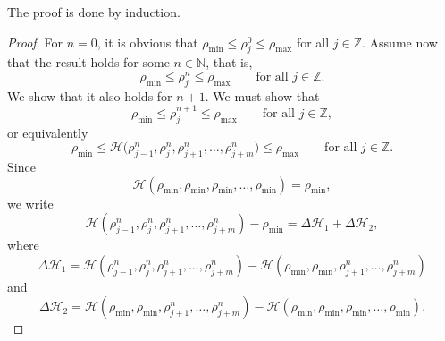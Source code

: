 The proof is done by induction.
\begin{proof}
    For $n=0$, it is obvious that $\rho_{\min} \leq \rho_j^0 \leq \rho_{\max}$ for all $ j \in \mathbb{Z}$. Assume now that the result holds for some $n \in \mathbb{N}$, that is,
    \[
        \rho_{\min} \leq \rho_j^n \leq \rho_{\max}  \qquad \text{for all } j \in \mathbb{Z}.
    \] We show that it also holds for $n+1$. We must show that
    \[
        \rho_{\min} \leq \rho_j^{n+1} \leq \rho_{\max} \qquad \text{for all } j \in \mathbb{Z},
    \]
    or equivalently
    \[
        \rho_{\min} \leq \mathcal{H}\bigl(\rho_{j-1}^n,\rho_j^n, \rho_{j+1}^n, \dots,\rho_{j+m}^n \bigr) \leq
        \rho_{\max} \qquad \text{for all } j \in \mathbb{Z}.
    \]
    Since
    \[
        \mathcal{H}(\rho_{\min},\rho_{\min},\rho_{\min},\dots,\rho_{\min})
        =\rho_{\min},
    \]
    we write
    \[
        \mathcal{H}(\rho_{j-1}^n,\rho_j^n,\rho_{j+1}^n,\dots,\rho_{j+m}^n)-\rho_{\min}
        =
        \Delta \mathcal{H}_1+\Delta \mathcal{H}_2,
    \]
    where
    \[\Delta \mathcal{H}_1 = \mathcal{H}( \rho_{j-1}^n, \rho_{j}^n,  \rho_{j+1}^n,\dots,  \rho_{j+m}^n) - \mathcal{H}( \rho_{\min}, \rho_{\min},  \rho_{j+1}^n,\dots,  \rho_{j+m}^n)\]
    and
    \[\Delta \mathcal{H}_2 = \mathcal{H}( \rho_{\min}, \rho_{\min},  \rho_{j+1}^n,\dots,  \rho_{j+m}^n) - \mathcal{H}(\rho_{\min}, \rho_{\min}, \rho_{\min},\dots, \rho_{\min}).
    \]


\end{proof}
